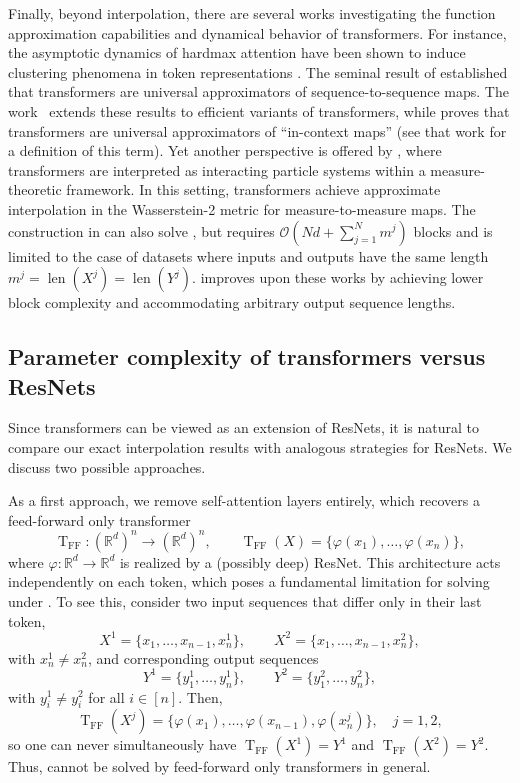 \documentclass[pdflatex,sn-mathphys-num]{sn-jnl}%
\theoremstyle{thmstyleone}%
\theoremstyle{thmstyletwo}%
\theoremstyle{thmstylethree}%
\numberwithin{equation}{section}
\newcommand{\R}{\mathbb{R}}
\DeclareMathOperator{\T}{\mathrm{T}}
\DeclareMathOperator{\len}{len}
\begin{document}
Finally, beyond interpolation, there are several works investigating the function approximation capabilities and dynamical behavior of transformers. For instance, the asymptotic dynamics of hardmax attention have been shown to induce clustering phenomena in token representations \cite{alcalde2025clustering}. 
The seminal result of \cite{yunAreTransformersUniversal2020} established that transformers are universal approximators of sequence-to-sequence maps. The work~\cite{alberti2023sumformer} extends these results to efficient variants of transformers, while \cite{furuya2025transformers} proves that transformers are universal approximators of ``in-context maps'' (see that work for a definition of this term). Yet another perspective is offered by \cite{geshkovski2024measure}, where transformers are interpreted as interacting particle systems within a measure-theoretic framework. In this setting, transformers achieve approximate interpolation in the Wasserstein-2 metric for measure-to-measure maps. The construction in \cite{geshkovski2024measure} can also solve , but requires $\mathcal{O}(Nd+\sum_{j=1}^N m^j)$ blocks and is limited to the case of datasets where inputs and outputs have the same length $m^j = \len(X^j) = \len (Y^j)$.  improves upon these works by achieving lower block complexity and accommodating arbitrary output sequence lengths. 

\subsection{Parameter complexity of transformers versus ResNets}\label{ss:paramComplexity}
Since transformers can be viewed as an extension of ResNets, it is natural to compare our exact interpolation results with analogous strategies for ResNets. We discuss two possible approaches.

As a first approach, we remove self-attention layers entirely, which recovers a feed-forward only transformer 
$$
    \T_{\mathrm{FF}}: (\R^d)^n \to (\R^d)^n, \qquad \T_{\mathrm{FF}}(X) = \{\varphi(x_1), \dots, \varphi(x_n)\},
$$
where $\varphi : \R^d \to \R^d$ is realized by a (possibly deep) ResNet. This architecture acts independently on each token, which poses a fundamental limitation for solving   under . 
To see this, consider two input sequences that differ only in their last token,
$$
X^1 = \{ x_1, \ldots, x_{n-1}, x^1_n \}, 
\qquad 
X^2 = \{ x_1, \ldots, x_{n-1}, x^2_n \},
$$
with $x^1_n \neq x^2_n$, and corresponding output sequences
$$
Y^1 = \{ y_1^1, \ldots, y_n^1 \}, 
\qquad 
Y^2 = \{ y_1^2, \ldots, y_n^2 \},
$$
with $y_i^1 \neq y_i^2$ for all $i\in [n]$. Then, 
$$
    \T_{\mathrm{FF}}(X^j) = \{\varphi(x_1), \ldots, \varphi(x_{n-1}), \varphi(x^j_n)\}, \quad j=1,2,
$$
so one can never simultaneously have $\T_{\mathrm{FF}}(X^1) = Y^1$ and $\T_{\mathrm{FF}}(X^2) = Y^2$. Thus,  cannot be solved by feed-forward only transformers in general.
\end{document}
